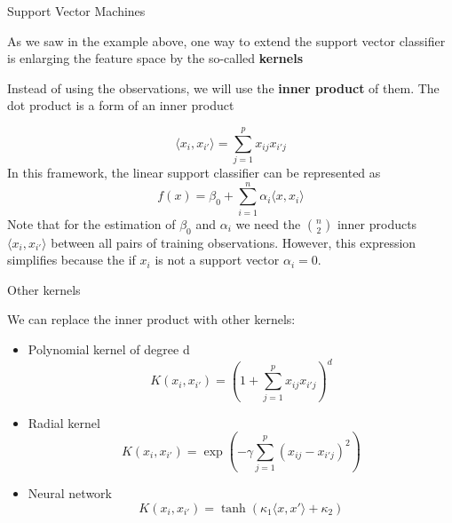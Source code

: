 \documentclass{beamer}
\begin{document}
\begin{frame}{Support Vector Machines}
	
	As we saw in the example above,  one way to extend the support vector classifier is enlarging the feature space by the so-called {\bf kernels}
	
	Instead of using the observations, we will use the {\bf inner product}  of them. The dot product is a form of an inner product
	
	\begin{equation*}
		\langle  x_i, x_{i'} \rangle = \sum_{j=1}^p x_{ij} x_{i'j}
	\end{equation*}
	In this framework, the linear support classifier can be represented as
	\begin{equation*}
		f(x) =\beta_0 + \sum_{i=1}^n \alpha_i \langle x,x_i \rangle
	\end{equation*}
Note that for the estimation of $\beta_0$ and $\alpha_i$ we need the $n \choose 2$ inner products $\langle x_i,x_{i'} \rangle$ between all pairs of training observations. However, this expression simplifies because the if $x_i$ is not a support vector $\alpha_i=0$. 
\end{frame}

\begin{frame}{Other kernels}
	
	
	We can replace the inner product with other kernels: 
	
	\begin{itemize}
		\item Polynomial kernel of degree d
		\begin{equation*}
			K(x_i,x_{i'})= (1 + \sum_{j=1}^p x_{ij}x_{i'j})^d
		\end{equation*}
	\item Radial kernel
	\begin{equation*}
K(x_i,x_{i'})= \exp \left( -\gamma \sum_{j=1}^p (x_{ij}-x_{i'j})^2 \right)
	\end{equation*}
\item Neural network
\begin{equation*}
	K(x_i,x_{i'})=\tanh (\kappa_1\langle x,x' \rangle + \kappa_2)
\end{equation*}
	\end{itemize}
\end{frame}
\end{document}
